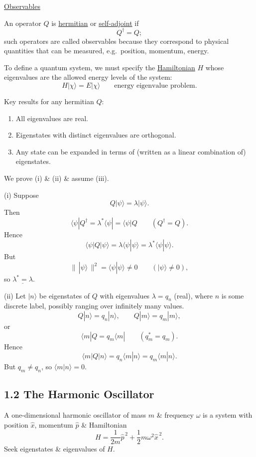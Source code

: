 \documentclass[11pt,a4paper]{article}
\begin{document}
\medskip

\noindent
\underline{Observables}

An operator $Q$ is \underline{hermitian} or
\underline{self-adjoint} if
\[
    Q^\dagger=Q;
\]
such operators are called observables because they correspond to
physical quantities that can be measured, e.g.\ position, momentum, energy.

To define a quantum system, we must specify the \underline{Hamiltonian}
$H$ whose eigenvalues are the allowed energy levels of the system:
\[
    H|\chi\rangle=E|\chi\rangle
    \qquad\text{energy eigenvalue problem.}
\]

Key results for any hermitian $Q$:
\begin{enumerate}
    \item[(i)] All eigenvalues are real.
    \item[(ii)] Eigenstates with distinct eigenvalues are orthogonal.
    \item[(iii)] Any state can be expanded in terms of
    (written as a linear combination of) eigenstates.
\end{enumerate}
We prove (i) \& (ii) \& assume (iii).

\medskip

\noindent
(i) Suppose
\[
    Q|\psi\rangle=\lambda|\psi\rangle.
\]
Then
\[
    \langle\psi|Q^\dagger
    =\lambda^*\langle\psi|
    =\langle\psi|Q
    \qquad(Q^\dagger=Q).
\]
Hence
\[
    \langle\psi|Q|\psi\rangle
    =\lambda\langle\psi|\psi\rangle
    =\lambda^*\langle\psi|\psi\rangle.
\]
But
\[
    \bigl\|\,|\psi\rangle\,\bigr\|^2
    =\langle\psi|\psi\rangle\neq0
    \qquad(|\psi\rangle\neq0),
\]
so $\underline{\lambda^*=\lambda}$.

\medskip

\noindent
(ii) Let $|n\rangle$ be eigenstates of $Q$ with eigenvalues
$\lambda=q_n$ (real), where $n$ is some discrete label,
possibly ranging over infinitely many values.
\[
    Q|n\rangle=q_n|n\rangle,
    \qquad
    Q|m\rangle=q_m|m\rangle,
\]
or
\[
    \langle m|Q=q_m\langle m|
    \qquad(q_m^*=q_m).
\]
Hence
\[
    \langle m|Q|n\rangle
    =q_n\langle m|n\rangle
    =q_m\langle m|n\rangle.
\]
But $q_m\neq q_n$, so $\langle m|n\rangle=0$.

\subsection*{1.2 The Harmonic Oscillator}

A one-dimensional harmonic oscillator of mass $m$ \& frequency
$\omega$ is a system with position $\hat{x}$, momentum $\hat{p}$
\& Hamiltonian
\[
    H=\frac{1}{2m}\hat{p}^{\,2}
    +\frac{1}{2}m\omega^2\hat{x}^{\,2}.
\]
Seek eigenstates \& eigenvalues of $H$.
\end{document}
